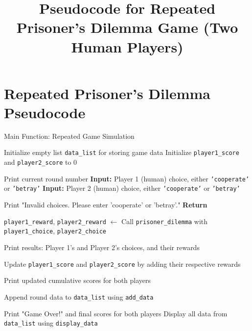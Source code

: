 \documentclass{article}
\begin{document}
\title{Pseudocode for Repeated Prisoner's Dilemma Game (Two Human Players)}
\author{}
\date{}
\maketitle

\section*{Repeated Prisoner's Dilemma Pseudocode}

\begin{algorithm}[H]
\caption{Main Function: Repeated Game Simulation}
\begin{algorithmic}[1]
\STATE Initialize empty list \texttt{data\_list} for storing game data
\STATE Initialize \texttt{player1\_score} and \texttt{player2\_score} to 0

  
    \STATE Print current round number
    \STATE \textbf{Input:} Player 1 (human) choice, either \texttt{'cooperate'} or \texttt{'betray'}
    \STATE \textbf{Input:} Player 2 (human) choice, either \texttt{'cooperate'} or \texttt{'betray'}

        \STATE Print "Invalid choices. Please enter 'cooperate' or 'betray'."
        \STATE \textbf{Return} 
    \ENDIF

    \STATE \texttt{player1\_reward}, \texttt{player2\_reward} $\gets$ Call \texttt{prisoner\_dilemma} with \texttt{player1\_choice}, \texttt{player2\_choice}

    \STATE Print results: Player 1's and Player 2's choices, and their rewards

    \STATE Update \texttt{player1\_score} and \texttt{player2\_score} by adding their respective rewards

    \STATE Print updated cumulative scores for both players

    \STATE Append round data to \texttt{data\_list} using \texttt{add\_data}

\ENDFOR

\STATE Print "Game Over!" and final scores for both players
\STATE Display all data from \texttt{data\_list} using \texttt{display\_data}
\end{algorithmic}
\end{algorithm}
\end{document}
